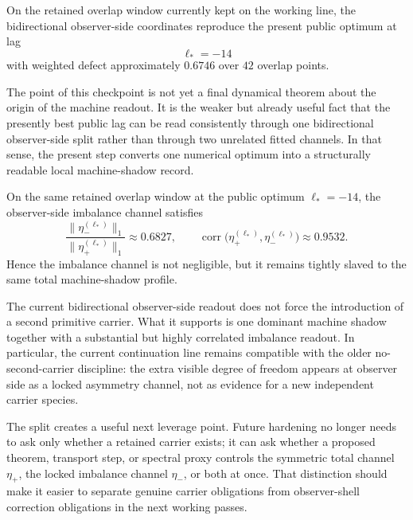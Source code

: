 \begin{proposition}
On the retained overlap window currently kept on the working line, the bidirectional observer-side coordinates reproduce the present public optimum at lag
\[
\ell_*=-14
\]
with weighted defect approximately \(0.6746\) over \(42\) overlap points.
\end{proposition}

\begin{remark}
The point of this checkpoint is not yet a final dynamical theorem about the origin of the machine readout. It is the weaker but already useful fact that the presently best public lag can be read consistently through one bidirectional observer-side split rather than through two unrelated fitted channels. In that sense, the present step converts one numerical optimum into a structurally readable local machine-shadow record.
\end{remark}

\begin{proposition}
On the same retained overlap window at the public optimum \(\ell_*=-14\), the observer-side imbalance channel satisfies
\[
\frac{\lVert \eta_-^{(\ell_*)}\rVert_1}{\lVert \eta_+^{(\ell_*)}\rVert_1}\approx 0.6827,
\qquad
\operatorname{corr}\!\bigl(\eta_+^{(\ell_*)},\eta_-^{(\ell_*)}\bigr)\approx 0.9532.
\]
Hence the imbalance channel is not negligible, but it remains tightly slaved to the same total machine-shadow profile.
\end{proposition}

\begin{corollary}
The current bidirectional observer-side readout does not force the introduction of a second primitive carrier. What it supports is one dominant machine shadow together with a substantial but highly correlated imbalance readout. In particular, the current continuation line remains compatible with the older no-second-carrier discipline: the extra visible degree of freedom appears at observer side as a locked asymmetry channel, not as evidence for a new independent carrier species.
\end{corollary}


\begin{remark}
The split creates a useful next leverage point. Future hardening no longer needs to ask only whether a retained carrier exists; it can ask whether a proposed theorem, transport step, or spectral proxy controls the symmetric total channel \(\eta_+\), the locked imbalance channel \(\eta_-\), or both at once. That distinction should make it easier to separate genuine carrier obligations from observer-shell correction obligations in the next working passes.
\end{remark}

